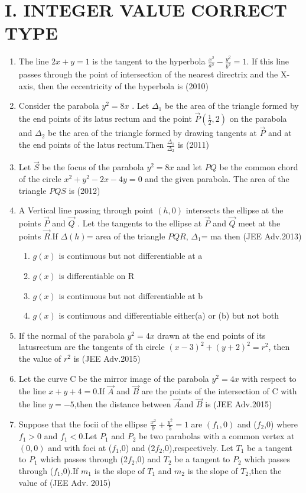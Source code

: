 \documentclass[journal]{IEEEtran}
\numberwithin{equation}{enumi}
\numberwithin{figure}{enumi}
\begin{document}
\section*{I. INTEGER VALUE CORRECT TYPE}
\begin{enumerate}
\item The line $2x+y=1$ is the tangent to the hyperbola $\frac{x^2}{a^2}-\frac{y^2}{b^2}=1$. If this line passes through the point of intersection of the nearest directrix and the X-axis, then the eccentricity of the hyperbola is
\hfill(2010)
\item Consider the parabola $y^2=8x$ . Let $\Delta_1$ be the area of the triangle formed by the end points of its latus rectum and the point $\Vec{P}$$(\frac{1}{2},2)$ on the parabola and $\Delta_2$ be the area of the triangle formed by drawing tangents at $\Vec{P}$ and at the end points of the latus rectum.Then $\frac{\Delta_1}{\Delta_2}$ is 
\hfill(2011)
\item Let $\Vec{S}$ be the focus of the parabola $y^2=8x$ and let $PQ$ be the common chord of the circle $x^2+y^2-2x-4y=0$ and the given parabola. The area of the triangle $PQS$ is
\hfill(2012)
\item A Vertical line passing through point $(h,0)$ intersects the ellipse   at the points  $\Vec{P}$ and $\Vec{Q}$ . Let the tangents to the ellipse at $\Vec{P}$ and $\Vec{Q}$ meet at the points $\Vec{R}$.If $\Delta(h)$= area of the triangle $PQR$, $\Delta_1$= ma
then 
\hfill(JEE Adv.2013)
\begin{enumerate}
    \item $g(x)$ is continuous but not differentiable at a
    \item $g(x)$ is differentiable on R
    \item $g(x)$ is continuous but not differentiable at b
    \item $g(x)$ is continuous and differentiable either(a) or (b) but not both 
    \end{enumerate}
\item If the normal of the parabola $y^2=4x$ drawn at the end points of its latusrectum are the tangents of th circle $(x-3)^2+(y+2)^2=r^2$, then the value of $r^2$ is
\hfill(JEE Adv.2015)
\item Let the curve C be the mirror image of the parabola $y^2=4x$ with respect to the line $x+y+4=0$.If $\Vec{A}$ and $\Vec{B}$ are the points of the intersection of C with the line $y=-5$,then the distance between $\Vec{A}$and $\Vec{B}$ is
\hfill(JEE Adv.2015)
\item Suppose that the focii of the ellipse $\frac{x^2}{9}+\frac{y^2}{5}=1$ are $(f_1,0)$ and ($f_2$,0) where $f_1>0$ and $f_1<0$.Let $P_1$ and $P_2$ be two parabolas with a common vertex at $(0,0)$ and with foci at ($f_1$,0) and (2$f_2$,0),respectively. Let $T_1$ be a tangent to $P_1$ which passes through (2$f_2$,0) and $T_2$ be a tangent to $P_2$ which passes through ($f_1$,0).If $m_1$ is the slope of $T_1$ and $m_2$ is the slope of $T_2$,then the value of
\hfill(JEE Adv. 2015)
\end{enumerate}
\end{document}

